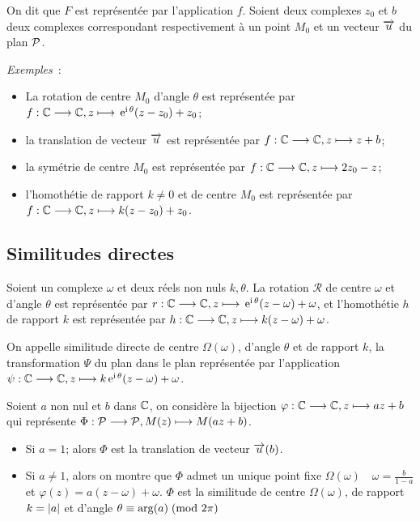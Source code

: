 On dit que \(F\) est représentée par l'application \(f\). Soient deux complexes
\(z_0\) et \(b\) deux complexes correspondant respectivement à un point \(M_0\)
et un vecteur \(\vect{u}\) du plan \(\P\).

\emph{Exemples}~:
\begin{itemize}
  \item La rotation de centre \(M_0\) d'angle \(\theta\) est représentée par
    \(\fonctionL{f}{\C}{\C}{z}{\expc{}{\theta}(z-z_0)  + z_0}\);
  \item la translation de vecteur \(\vect{u}\) est représentée par
    \(\fonctionL{f}{\C}{\C}{z}{z + b}\);
  \item la symétrie de centre \(M_0\) est représentée par
    \(\fonctionL{f}{\C}{\C}{z}{2z_0-z}\);
  \item l'homothétie de rapport \(k\neq 0\) et de centre \(M_0\) est
    représentée par \(\fonctionL{f}{\C}{\C}{z}{k(z-z_0) + z_0}\).
\end{itemize}

\subsection{Similitudes directes}\label{subsec:simdirecte}

Soient un complexe \(\omega\) et deux réels non nuls \(k, \theta \). La rotation
\(\mathcal{R}\) de centre \(\omega\) et d'angle \(\theta\) est représentée par
\(\fonctionL{r}{\C}{\C}{z}{\expc{}{\theta}(z-\omega) + \omega}\), et
l'homothétie \(h\) de rapport \(k\) est représentée par
\(\fonctionL{h}{\C}{\C}{z}{k(z-\omega) + \omega}\).

\begin{defdef}
  On appelle similitude directe de centre \(\Omega(\omega)\), d'angle
  \(\theta\) et de rapport \(k\), la transformation \(\Psi\) du plan
  dans le plan représentée par l'application
  \(\fonctionL{\psi}{\C}{\C}{z}{\expc{k}{\theta}(z-\omega) + \omega}\).
\end{defdef}
Soient \(a\) non nul et \(b\) dans \(\C\), on considère la bijection
\(\fonctionL{\varphi}{\C}{\C}{z}{az + b}\) qui représente
\(\fonctionL{\Phi}{\P}{\P}{M(z)}{M(az + b)}\).

\begin{itemize}
  \item Si \(a = 1\); alors  \(\Phi\) est la translation de vecteur
    \(\vect{u}(b)\).
  \item Si \(a \neq 1\), alors on montre que \(\Phi\) admet un unique point
    fixe \(\Omega(\omega) \quad \omega = \frac{b}{1-a}\) et \(\varphi(z) =
    a(z-\omega) + \omega\).
    \(\Phi\) est la similitude de centre \(\Omega(\omega)\), de rapport \(k
    = \abs{a}\) et d'angle \(\congru{\theta}{\arg(a)}{2\pi}\)
\end{itemize}

